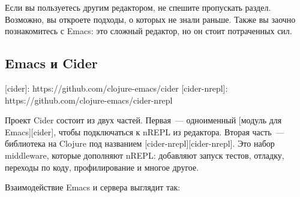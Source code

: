 Если вы пользуетесь другим редактором, не спешите пропускать раздел. Возможно, вы откроете подходы, о которых не знали раньше. Также вы заочно познакомитесь с Emacs: это сложный редактор, но он стоит потраченных сил.

\subsection{Emacs и Cider}

[cider]: https://github.com/clojure-emacs/cider
[cider-nrepl]: https://github.com/clojure-emacs/cider-nrepl

Проект Cider состоит из двух частей. Первая~--- одноименный [модуль для Emacs][cider], чтобы подключаться к nREPL из редактора. Вторая часть~--- библиотека на Clojure под названием [cider-nrepl][cider-nrepl]. Это набор middleware, которые дополняют nREPL: добавляют запуск тестов, отладку, переходы по коду, профилирование и многое другое.

Взаимодействие Emacs и сервера выглядит так:


